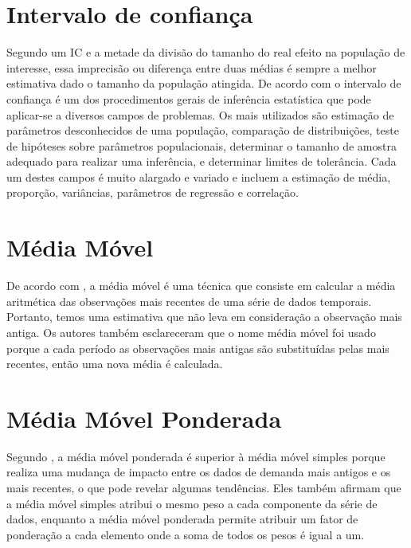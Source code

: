 \section{Intervalo de confiança}
Segundo \cite{patino2015intervalos} um IC e a metade da divisão do tamanho do real efeito na população de interesse, essa imprecisão ou diferença entre duas médias é sempre a melhor estimativa dado o tamanho da população atingida. De acordo com \cite{henriques2011dificuldades} o intervalo de confiança é um dos procedimentos gerais de inferência estatística que pode aplicar-se a diversos campos de problemas. Os mais utilizados são estimação de parâmetros desconhecidos de uma população, comparação de distribuições, teste de hipóteses sobre parâmetros populacionais, determinar o tamanho de amostra adequado para realizar uma inferência, e determinar limites de tolerância. Cada um destes campos é muito alargado e variado e incluem a estimação de média, proporção, variâncias, parâmetros de regressão e correlação.  

\section{Média Móvel}
De acordo com \cite{santos2021educaccao}, a média móvel é uma técnica que consiste em calcular a média aritmética das observações mais recentes de uma série de dados temporais. Portanto, temos uma estimativa que não leva em consideração a observação mais antiga. Os autores também esclareceram que o nome média móvel foi usado porque a cada período as observações mais antigas são substituídas pelas mais recentes, então uma nova média é calculada.


\section{Média Móvel Ponderada}
Segundo \cite{ribeiro2020analise}, a média móvel ponderada é superior à média móvel simples porque realiza uma mudança de impacto entre os dados de demanda mais antigos e os mais recentes, o que pode revelar algumas tendências. Eles também afirmam que a média móvel simples atribui o mesmo peso a cada componente da série de dados, enquanto a média móvel ponderada permite atribuir um fator de ponderação a cada elemento onde a soma de todos os pesos é igual a um.


